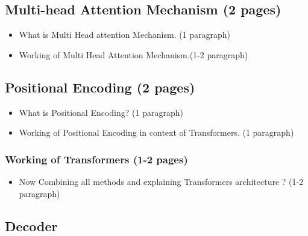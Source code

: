 \documentclass[%
	BCOR=8mm, %
	DIV=12, 
	toc=bibliography, %
	toc=listof, %
	oneside, %
	egregdoesnotlikesansseriftitles, %
	]{scrbook}
\begin{document}
\subsection{Multi-head Attention Mechanism (2 pages)}
\begin{itemize}
\item What is Multi Head attention Mechanism. (1 paragraph)
\item Working of Multi Head Attention Mechanism.(1-2 paragraph)
\end{itemize}

\subsection{Positional Encoding (2 pages)}
\begin{itemize}
\item What is Positional Encoding? (1 paragraph)
\item Working of Positional Encoding in context of Transformers. (1 paragraph)
\end{itemize}
\subsubsection{ Working of Transformers (1-2 pages)}
\begin{itemize}
\item Now Combining all methods and explaining Transformers architecture ? (1-2 paragraph)
\end{itemize}

\subsection{Decoder}
\end{document}
